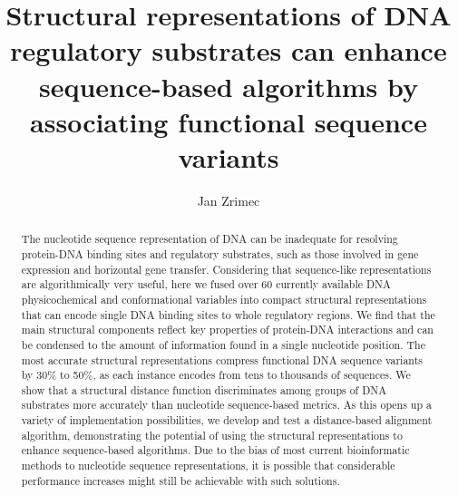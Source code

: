 \documentclass[sigconf]{acmart}
\begin{document}
\title{Structural representations of DNA regulatory substrates can enhance sequence-based algorithms by associating functional sequence variants}

\author{Jan Zrimec}

\renewcommand{\shortauthors}{Zrimec J.}

\begin{abstract}
  The nucleotide sequence representation of DNA can be inadequate for resolving protein-DNA binding sites and regulatory substrates, such as those involved in gene expression and horizontal gene transfer. Considering that sequence-like representations are algorithmically very useful, here we fused over 60 currently available DNA physicochemical and conformational variables into compact structural representations that can encode single DNA binding sites to whole regulatory regions. We find that the main structural components reflect key properties of protein-DNA interactions and can be condensed to the amount of information found in a single nucleotide position. The most accurate structural representations compress functional DNA sequence variants by 30\% to 50\%, as each instance encodes from tens to thousands of sequences. We show that a structural distance function discriminates among groups of DNA substrates more accurately than nucleotide sequence-based metrics. As this opens up a variety of implementation possibilities, we develop and test a distance-based alignment algorithm, demonstrating the potential of using the structural representations to enhance sequence-based algorithms. Due to the bias of most current bioinformatic methods to nucleotide sequence representations, it is possible that considerable performance increases might still be achievable with such solutions.
\end{abstract}
\end{document}
